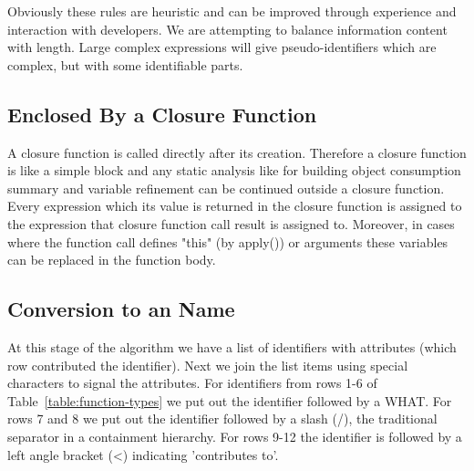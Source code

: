 \documentclass[10pt, preprint]{sigplanconf}
\begin{document}
{Obviously these rules are heuristic and can be improved through experience and interaction with developers. We are attempting to balance information content with length. Large complex expressions will give pseudo-identifiers which are complex, but with some identifiable parts.



\begin{table}
\centering
{}
\caption{JavaScript Expression Reduction to a Name. Expressions which match an entry in the pattern column are converted as shown in the Name column. Here \texttt{e} indicates an expression, \texttt{id} indicates an identifier, \texttt{+} means string concatenation and \texttt{Name()} means we apply the pattern matching recursively.}
\label{expression-reduction} 
\end{table}    

\subsection{Enclosed By a Closure Function}
A closure function is called directly after its creation. Therefore a closure function is like a simple block and any static analysis like
for building object consumption summary and variable refinement can be continued outside a closure function. Every expression which its value
is returned in the closure function is assigned to the expression that closure function call result is assigned to. Moreover, in cases where the
function call defines "this" (by apply()) or arguments these variables can be replaced in the function body.

\subsection{Conversion to an Name}
At this stage of the algorithm we have a list of identifiers with attributes (which row contributed the identifier). Next we join the list items using special characters to signal the attributes. For identifiers from rows 1-6 of Table~\ref{table:function-types} we put out the identifier followed by a WHAT. For rows 7 and 8 we put out the identifier followed by a slash (/), the traditional separator in a containment hierarchy. For rows 9-12 the identifier is followed by a left angle bracket (<) indicating 'contributes to'. 

}
\end{document}
